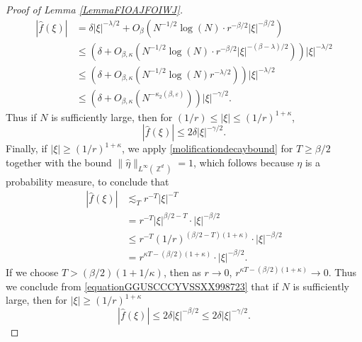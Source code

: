 \documentclass[dvipsnames,letterpaper,12pt]{article}
\numberwithin{equation}{section}
\DeclareMathOperator{\ZZ}{\mathbb{Z}}
\numberwithin{theorem}{section}
\begin{document}
\begin{proof}[Proof of Lemma \ref{LemmaFIOAJFOIWJ}]
    \begin{equation} \label{equationGGOOSC66341}
    \begin{split}
        |\widehat{f}(\xi)| &= \delta |\xi|^{-\lambda/2} + O_\beta \left( N^{-1/2} \log(N) \cdot r^{-\beta/2} |\xi|^{-\beta/2} \right)\\
        &\leq \left( \delta + O_{\beta,\kappa} \left( N^{-1/2} \log(N) \cdot r^{-\beta/2} |\xi|^{-(\beta - \lambda)/2} \right) \right) |\xi|^{- \lambda/2}\\
        &\leq \left( \delta + O_{\beta,\kappa} \left( N^{-1/2} \log(N) r^{-\lambda/2} \right) \right) |\xi|^{-\lambda/2}\\
        &\leq ( \delta + O_{\beta,\kappa} (N^{-\kappa_2(\beta,\varepsilon)}) ) |\xi|^{-\gamma/2}.
    \end{split}
    \end{equation}
    Thus if $N$ is sufficiently large, then for $(1/r) \leq |\xi| \leq (1/r)^{1+\kappa}$,
    \begin{equation} \label{equationaJJDIWJDIWJDIWJIDJW44141}
        |\widehat{f}(\xi)| \leq 2 \delta |\xi|^{-\gamma/2}.
    \end{equation}
    Finally, if $|\xi| \geq (1/r)^{1 + \kappa}$, we apply \eqref{molificationdecaybound} for $T \geq \beta/2$ together with the bound $\| \widehat{\eta} \|_{L^\infty(\ZZ^d)} = 1$, which follows because $\eta$ is a probability measure, to conclude that
    \begin{equation} \label{equationGGUSCCCYVSSXX998723}
    \begin{split}
        |\widehat{f}(\xi)| &\lesssim_T r^{-T} |\xi|^{-T}\\
        &= r^{-T} |\xi|^{\beta/2 - T} \cdot |\xi|^{-\beta/2}\\
        &\leq r^{-T} (1/r)^{(\beta/2 - T)(1 + \kappa)} \cdot |\xi|^{-\beta/2}\\
        &= r^{\kappa T - (\beta/2)(1 + \kappa)} \cdot |\xi|^{-\beta/2}.
    \end{split}
    \end{equation}
    If we choose $T > (\beta/2)(1 + 1/\kappa)$, then as $r \to 0$, $r^{\kappa T - (\beta/2)(1 + \kappa)} \to 0$. Thus we conclude from \eqref{equationGGUSCCCYVSSXX998723} that if $N$ is sufficiently large, then for $|\xi| \geq (1/r)^{1 + \kappa}$
    \begin{equation} \label{equationBBCDSGDCC77}
        |\widehat{f}(\xi)| \leq 2 \delta |\xi|^{-\beta/2} \leq 2 \delta |\xi|^{- \gamma/2}.
    \end{equation}

\end{proof}
\end{document}
